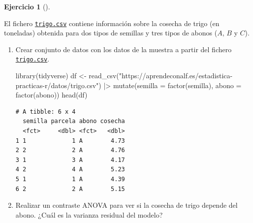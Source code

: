 \documentclass[
  a4paper,
]{scrreport}
\newenvironment{Shaded}{\begin{snugshade}}{\end{snugshade}}
\newcommand{\AttributeTok}[1]{\textcolor[rgb]{0.40,0.45,0.13}{#1}}
\newcommand{\FunctionTok}[1]{\textcolor[rgb]{0.28,0.35,0.67}{#1}}
\newcommand{\NormalTok}[1]{\textcolor[rgb]{0.00,0.23,0.31}{#1}}
\newcommand{\OtherTok}[1]{\textcolor[rgb]{0.00,0.23,0.31}{#1}}
\newcommand{\SpecialCharTok}[1]{\textcolor[rgb]{0.37,0.37,0.37}{#1}}
\newcommand{\StringTok}[1]{\textcolor[rgb]{0.13,0.47,0.30}{#1}}
\theoremstyle{definition}
\newtheorem{exercise}{Ejercicio}[chapter]
\theoremstyle{remark}
\begin{document}
\begin{exercise}[]\protect\hypertarget{exr-anova-dos-factores-trigo}{}\label{exr-anova-dos-factores-trigo}

El fichero
\href{https://aprendeconalf.es/estadistica-practicas-r/datos/trigo.csv}{\texttt{trigo.csv}}
contiene información sobre la cosecha de trigo (en toneladas) obtenida
para dos tipos de semillas y tres tipos de abonos (\(A\), \(B\) y
\(C\)).

\begin{enumerate}
\def\labelenumi{\alph{enumi}.}
\item
  Crear conjunto de datos con los datos de la muestra a partir del
  fichero
  \href{https://aprendeconalf.es/estadistica-practicas-r/datos/trigo.csv}{\texttt{trigo.csv}}.

  \begin{tcolorbox}[enhanced jigsaw, breakable, toptitle=1mm, colbacktitle=quarto-callout-tip-color!10!white, rightrule=.15mm, opacityback=0, opacitybacktitle=0.6, titlerule=0mm, coltitle=black, colframe=quarto-callout-tip-color-frame, colback=white, bottomtitle=1mm, leftrule=.75mm, toprule=.15mm, title=\textcolor{quarto-callout-tip-color}{\faLightbulb}\hspace{0.5em}{Solución}, arc=.35mm, bottomrule=.15mm, left=2mm]

\begin{Shaded}
\begin{Highlighting}[]
\FunctionTok{library}\NormalTok{(tidyverse)}
\NormalTok{df }\OtherTok{\textless{}{-}} \FunctionTok{read\_csv}\NormalTok{(}\StringTok{"https://aprendeconalf.es/estadistica{-}practicas{-}r/datos/trigo.csv"}\NormalTok{) }\SpecialCharTok{|\textgreater{}} 
    \FunctionTok{mutate}\NormalTok{(}\AttributeTok{semilla =} \FunctionTok{factor}\NormalTok{(semilla), }\AttributeTok{abono =} \FunctionTok{factor}\NormalTok{(abono))}
\FunctionTok{head}\NormalTok{(df)}
\end{Highlighting}
\end{Shaded}

\begin{verbatim}
# A tibble: 6 x 4
  semilla parcela abono cosecha
  <fct>     <dbl> <fct>   <dbl>
1 1             1 A        4.73
2 2             2 A        4.76
3 1             3 A        4.17
4 2             4 A        5.23
5 1             1 A        4.39
6 2             2 A        5.15
\end{verbatim}

  \end{tcolorbox}
\item
  Realizar un contraste ANOVA para ver si la cosecha de trigo depende
  del abono. ¿Cuál es la varianza residual del modelo?


\end{enumerate}
\end{exercise}
\end{document}
